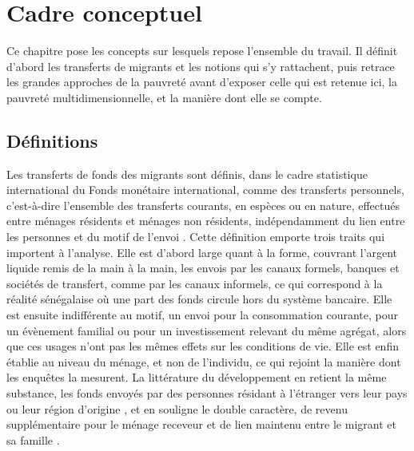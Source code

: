\section{Cadre conceptuel}
\label{sec:cadre_conceptuel}

Ce chapitre pose les concepts sur lesquels repose l'ensemble du travail. Il
définit d'abord les transferts de migrants et les notions qui s'y rattachent,
puis retrace les grandes approches de la pauvreté avant d'exposer celle qui est
retenue ici, la pauvreté multidimensionnelle, et la manière dont elle se compte.

\subsection{Définitions}

Les transferts de fonds des migrants sont définis, dans le cadre
statistique international du Fonds monétaire international, comme des
transferts personnels, c'est-à-dire l'ensemble des transferts courants, en
espèces ou en nature, effectués entre ménages résidents et ménages non
résidents, indépendamment du lien entre les personnes et du motif de
l'envoi \parencite{fmi2009}. Cette définition emporte trois traits qui
importent à l'analyse. Elle est d'abord large quant à la forme, couvrant
l'argent liquide remis de la main à la main, les envois par les canaux
formels, banques et sociétés de transfert, comme par les canaux informels,
ce qui correspond à la réalité sénégalaise où une part des fonds circule
hors du système bancaire. Elle est ensuite indifférente au motif, un envoi
pour la consommation courante, pour un évènement familial ou pour un
investissement relevant du même agrégat, alors que ces usages n'ont pas les
mêmes effets sur les conditions de vie. Elle est enfin établie au niveau du
ménage, et non de l'individu, ce qui rejoint la manière dont les enquêtes
la mesurent. La littérature du développement en retient la même substance,
les fonds envoyés par des personnes résidant à l'étranger vers leur pays ou
leur région d'origine \parencite{maimbo2005}, et en souligne le double
caractère, de revenu supplémentaire pour le ménage receveur et de lien
maintenu entre le migrant et sa famille \parencite{rapport2006}.

